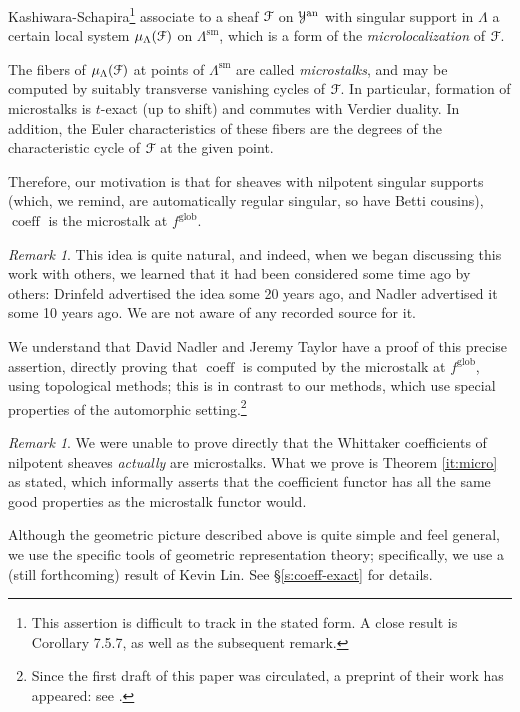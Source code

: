 \documentclass[reqno,11pt]{amsart}
\numberwithin{equation}{subsection}
\theoremstyle{remark}
\newtheorem{rem}[thm]{Remark}
\newcommand{\sF}{{\EuScript F}}
\newcommand{\sY}{{\EuScript Y}}
\newcommand{\on}{\operatorname}
\newcommand{\coeff}{\on{coeff}}
\begin{document}
Kashiwara-Schapira\footnote{This assertion is difficult to track
in the stated form. A close result is \cite{ks} Corollary 7.5.7,
as well as the subsequent remark.} 
\cite{ks} associate to a 
sheaf $\sF$ on $\sY^{\on{an}}$ with singular support in $\Lambda$
a certain local system $\mu_{\Lambda}(\sF)$ on $\Lambda^{\on{sm}}$,
which is a form of the \emph{microlocalization} of $\sF$.

The fibers of $\mu_{\Lambda}(\sF)$ at points of $\Lambda^{\on{sm}}$
are called \emph{microstalks}, and may be computed by suitably
transverse vanishing cycles of $\sF$. In particular, formation 
of microstalks is $t$-exact (up to shift) and commutes with Verdier duality.
In addition, the Euler characteristics 
of these fibers are the degrees of the characteristic cycle of $\sF$
at the given point.

Therefore, our motivation is that for sheaves with nilpotent singular
supports (which, we remind, are automatically regular singular, so have
Betti cousins), $\coeff$ is the microstalk at $f^{\on{glob}}$.

\begin{rem}

This idea is quite natural, and indeed, when we began discussing this
work with others, we learned 
that it had been considered some time ago by 
others: Drinfeld advertised the idea some 20 years ago, and 
Nadler advertised it some 10 years ago. We are not aware of any recorded
source for it. 

We understand that David Nadler and Jeremy Taylor
have a proof of this precise assertion, directly proving that 
$\coeff$ is computed by the microstalk at $f^{\on{glob}}$, using topological methods;
this is in contrast to our methods, which use special properties
of the automorphic setting.\footnote{Since the first draft of this
paper was circulated, a preprint of their work has appeared: see 
\cite{nadler-taylor}.}

\end{rem}

\begin{rem}

We were unable to prove directly that the Whittaker coefficients
of nilpotent sheaves \emph{actually} are microstalks. What we prove
is Theorem \ref{it:micro} as stated, which informally asserts that
the coefficient functor has all the same good properties as the microstalk
functor would.

Although the geometric picture described above is quite simple and feel
general, we use the specific tools of geometric representation theory; 
specifically, we use a (still forthcoming) result of Kevin Lin.
See \S \ref{s:coeff-exact} for details.

\end{rem}
\end{document}
